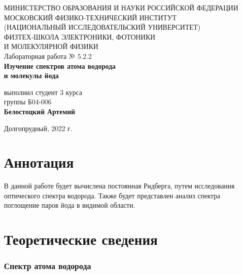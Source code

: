 \documentclass[a4paper,12pt]{article}
\begin{document}
 

\begin{titlepage}
	\begin{center}
		\large 	МИНИСТЕРСТВО ОБРАЗОВАНИЯ И НАУКИ РОССИЙСКОЙ ФЕДЕРАЦИИ\\
				МОСКОВСКИЙ ФИЗИКО-ТЕХНИЧЕСКИЙ ИНСТИТУТ \\
				(НАЦИОНАЛЬНЫЙ ИССЛЕДОВАТЕЛЬСКИЙ УНИВЕРСИТЕТ)\\ 
				ФИЗТЕХ-ШКОЛА ЭЛЕКТРОНИКИ, ФОТОНИКИ \\
				И МОЛЕКУЛЯРНОЙ ФИЗИКИ \\
		
		
		\vspace{4.0 cm}
		Лабораторная работа № 5.2.2 \\ 
		\LARGE \textbf{Изучение спектров атома водорода \\ и молекулы йода}
	\end{center}
	\vspace{3 cm} \large
	
	\begin{flushright}
		выполнил студент 3 курса \\
		{группы Б04-006}\\
		\textbf{Белостоцкий Артемий}\\
	\end{flushright}
	
	\vfill

	\begin{center}
	Долгопрудный, 2022 г.
	\end{center}
\end{titlepage}                                                                      

\section*{Аннотация}

В данной работе будет вычислена постоянная Ридберга, путем исследования оптического спектра водорода. Также будет представлен анализ спектра поглощение паров йода в видимой области.

\section*{Теоретические сведения}

\subsubsection*{Спектр атома водорода}
\end{document}

